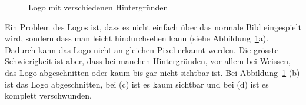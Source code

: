 \documentclass[12pt,a4paper]{report}
\begin{document}
\begin{figure}[h]%
    \centering
    \qquad
    \qquad
    \qquad
    \caption{Logo mit verschiedenen Hintergründen}%
    \label{fig:logo2}%
\end{figure}

Ein Problem des Logos ist, dass es nicht einfach über das normale Bild eingespielt wird, sondern dass man leicht hindurchsehen kann (siehe Abbildung~\ref{fig:logo2}a).
Dadurch kann das Logo nicht an gleichen Pixel erkannt werden.
Die grösste Schwierigkeit ist aber, dass bei manchen Hintergründen, vor allem bei Weissen, das Logo abgeschnitten oder kaum bis gar nicht sichtbar ist.
Bei Abbildung~\ref{fig:logo2} (b) ist das Logo abgeschnitten, bei (c) ist es kaum sichtbar und bei (d) ist es komplett verschwunden.
\end{document}

